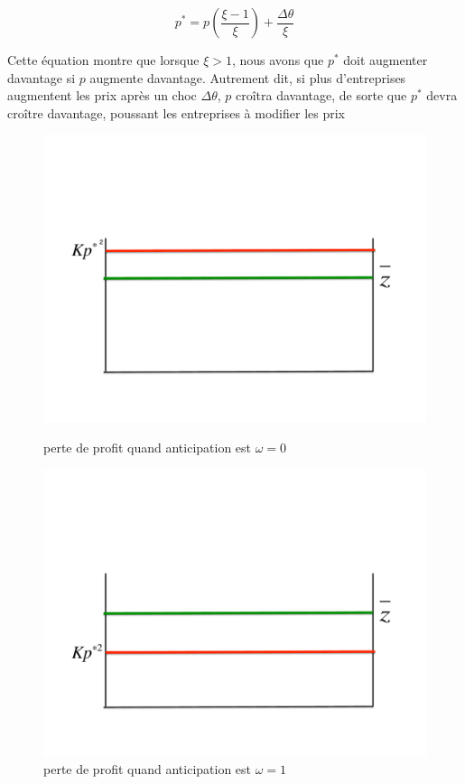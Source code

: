\documentclass[11pt,a4paper]{article}
\begin{document}
\begin{enumerate}
\begin{equation}\label{price2}
p^{\ast }=p\left(\frac{\xi-1}{\xi }\right) + \frac{\Delta \theta}{\xi} 
\end{equation}%


Cette équation montre que lorsque $ \xi>1$, nous avons que $p^{\ast}$ doit augmenter davantage si $ p $ augmente davantage. Autrement dit, si plus d'entreprises augmentent les prix après un choc $ \Delta \theta $, $ p $ croîtra davantage, de sorte que $ p^{\ast} $ devra croître davantage, poussant les entreprises à modifier les prix 

 


\begin{figure}[!tbp]
  \centering
  \begin{minipage}[b]{0.4\textwidth}
    \includegraphics[width=1.3\textwidth]{opti.pdf}
    \caption{perte de profit quand anticipation est $\omega =0$}
  \end{minipage}
  \hfill
  \begin{minipage}[b]{0.4\textwidth}
    \includegraphics[width=1.3\textwidth]{opt.pdf}
    \caption{perte de profit quand anticipation est $\omega =1$}
  \end{minipage}
\end{figure}


\end{enumerate}
\end{document}
